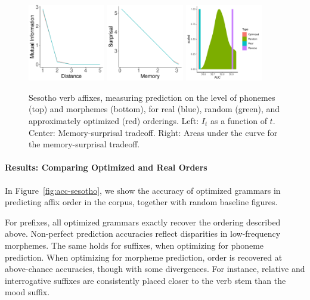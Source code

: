 \begin{figure}
\begin{center}
\includegraphics[width=0.3\textwidth]{figures/Sesotho-suffixes-byMorphemes-it-heldout.pdf}
\includegraphics[width=0.3\textwidth]{figures/Sesotho-suffixes-byMorphemes-memsurp-heldout.pdf}
\includegraphics[width=0.3\textwidth]{figures/Sesotho-suffixes-byMorphemes-auc-hist-heldout.pdf}
\end{center}
	\caption{Sesotho verb affixes, measuring prediction on the level of phonemes (top) and morphemes (bottom), for real (blue), random (green), and approximately optimized (red) orderings. Left: $I_t$ as a function of $t$. Center: Memory-surprisal tradeoff. Right: Areas under the curve for the memory-surprisal tradeoff.}\label{fig:jap-phon-morph}
\end{figure}





\paragraph{Results: Comparing Optimized and Real Orders}

In Figure~\ref{fig:acc-sesotho}, we show the accuracy of optimized grammars in predicting affix order in the corpus, together with random baseline figures.

For prefixes, all optimized grammars exactly recover the ordering described above.
Non-perfect prediction accuracies reflect disparities in low-frequency morphemes.
The same holds for suffixes, when optimizing for phoneme prediction.
When optimizing for morpheme prediction, order is recovered at above-chance accuracies, though with some divergences.
For instance, relative and interrogative suffixes are consistently placed closer to the verb stem than the mood suffix.

